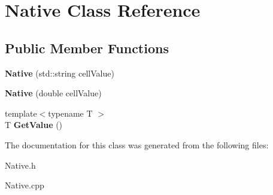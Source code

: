 \hypertarget{class_native}{}\section{Native Class Reference}
\label{class_native}
\subsection*{Public Member Functions}
\begin{DoxyCompactItemize}
\item 
\hypertarget{class_native_ac10863ad4c8a229bb1dd8b3e66cddce7}{}{\bfseries Native} (std\+::string cell\+Value)\label{class_native_ac10863ad4c8a229bb1dd8b3e66cddce7}

\item 
\hypertarget{class_native_a28e219ba164ed6bcb6ab57cee0c20ef4}{}{\bfseries Native} (double cell\+Value)\label{class_native_a28e219ba164ed6bcb6ab57cee0c20ef4}

\item 
\hypertarget{class_native_a56d8a378eafca495d7bf7eaa14e5568d}{}{\footnotesize template$<$typename T $>$ }\\T {\bfseries Get\+Value} ()\label{class_native_a56d8a378eafca495d7bf7eaa14e5568d}

\end{DoxyCompactItemize}


The documentation for this class was generated from the following files\+:\begin{DoxyCompactItemize}
\item 
Native.\+h\item 
Native.\+cpp\end{DoxyCompactItemize}
